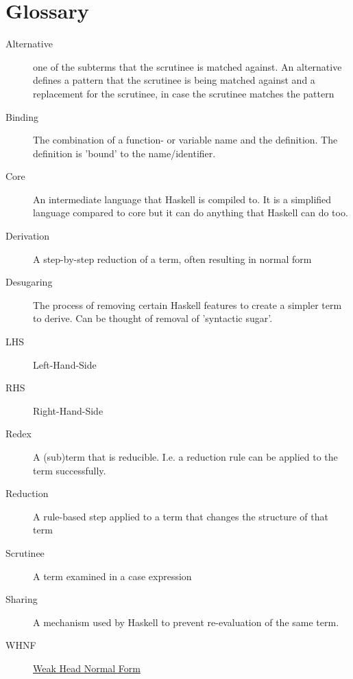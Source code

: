 \newpage

\section*{Glossary}

\begin{description}
    \item[Alternative] one of the subterms that the scrutinee is matched against.
        An alternative defines a pattern that the scrutinee is being matched against
        and a replacement for the scrutinee, in case the scrutinee matches the pattern
    \item[Binding] The combination of a function- or variable name and the definition.
        The definition is 'bound' to the name/identifier.
    \item[Core] An intermediate language that Haskell is compiled to.
        It is a simplified language compared to core but it can do anything that Haskell can do too.
    \item[Derivation] A step-by-step reduction of a term, often resulting in normal form
    \item[Desugaring] The process of removing certain Haskell features to create a simpler term to derive.
        Can be thought of removal of 'syntactic sugar'.
    \item[LHS] Left-Hand-Side 
    \item[RHS] Right-Hand-Side
    \item[Redex] A (sub)term that is reducible. I.e. a reduction rule can be applied to the term successfully.
    \item[Reduction] A rule-based step applied to a term that changes the structure of that term
    \item[Scrutinee] A term examined in a case expression
    \item[Sharing] A mechanism used by Haskell to prevent re-evaluation of the same term.
    \item[WHNF] \href{https://wiki.haskell.org/Weak_head_normal_form#:~:text=An%20expression%20is%20in%20weak,abstraction%20%5Cx%20%2D%3E%20expression%20.}{Weak Head Normal Form}
\end{description}